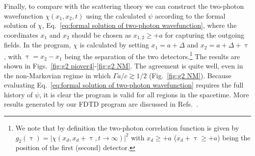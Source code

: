 \documentclass[final,1p,times]{elsarticle}
\begin{document}
Finally, to compare with the scattering theory we can construct the two-photon wavefunction $\chi(x_1, x_2, t)$ using the calculated $\psi$ according to the formal solution of $\chi$, Eq.~\eqref{eq:formal solution of two-photon wavefunction},
where the coordinates $x_1$ and $x_2$ should be chosen as $x_{1,2}\geq +a$ for capturing the outgoing fields. In the program, $\chi$ is calculated by setting $x_1=a+\Delta$ and $x_2=a+\Delta+\uptau$, with $\uptau=x_2-x_1$ being the separation of the two detectors.\footnote{We note that by definition the two-photon correlation function is given by $g_2(\uptau) = |\chi(x_d, x_d+\uptau, t\rightarrow\infty)|^2$ with $x_d\geq+a$ ($x_d+\uptau\geq+a$) being the position of the first (second) detector.} The results are shown in Figs.~\ref{fig:g2 piover4}-\ref{fig:g2 NM}. The agreement is quite well, even in the non-Markovian regime in which $\Gamma a/c\gtrsim1/2$ (Fig.~\ref{fig:g2 NM}). Because evaluating Eq.~\eqref{eq:formal solution of two-photon wavefunction} requires the full history of $\psi$, it is clear the program is valid for all regions in the spacetime.
More results generated by our FDTD program are discussed in Refs.~\cite{FangNJP18,FangPRA15err,FrancescoBIC}. 
\end{document}
